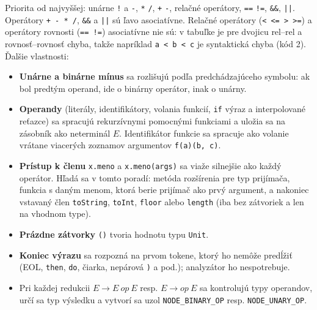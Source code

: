 Priorita od najvyššej: unárne \texttt{!} a \texttt{-}, \texttt{*} \texttt{/}, \texttt{+} \texttt{-}, relačné operátory, \texttt{==} \texttt{!=}, \texttt{\&\&}, \texttt{||}. Operátory \texttt{+ - * /}, \texttt{\&\&} a \texttt{||} sú ľavo asociatívne. Relačné operátory (\texttt{< <= > >=}) a operátory rovnosti (\texttt{== !=}) asociatívne nie sú: v tabuľke je pre dvojicu rel--rel a rovnosť--rovnosť chyba, takže napríklad \texttt{a < b < c} je syntaktická chyba (kód 2). Ďalšie vlastnosti:
\begin{itemize}
    \item \textbf{Unárne a binárne mínus} sa rozlišujú podľa predchádzajúceho symbolu: ak bol predtým operand, ide o binárny operátor, inak o unárny.
    \item \textbf{Operandy} (literály, identifikátory, volania funkcií, \texttt{if} výraz a interpolované reťazce) sa spracujú rekurzívnymi pomocnými funkciami a uložia sa na zásobník ako neterminál $E$. Identifikátor funkcie sa spracuje ako volanie vrátane viacerých zoznamov argumentov \texttt{f(a)(b, c)}.
    \item \textbf{Prístup k členu} \texttt{x.meno} a \texttt{x.meno(args)} sa viaže silnejšie ako každý operátor. Hľadá sa v tomto poradí: metóda rozšírenia pre typ prijímača, funkcia s daným menom, ktorá berie prijímač ako prvý argument, a nakoniec vstavaný člen \texttt{toString}, \texttt{toInt}, \texttt{floor} alebo \texttt{length} (iba bez zátvoriek a len na vhodnom type).
    \item \textbf{Prázdne zátvorky} \texttt{()} tvoria hodnotu typu \texttt{Unit}.
    \item \textbf{Koniec výrazu} sa rozpozná na prvom tokene, ktorý ho nemôže predĺžiť (EOL, \texttt{then}, \texttt{do}, čiarka, nepárová \texttt{)} a pod.); analyzátor ho nespotrebuje.
    \item Pri každej redukcii $E \rightarrow E\ op\ E$ resp. $E \rightarrow op\ E$ sa kontrolujú typy operandov, určí sa typ výsledku a vytvorí sa uzol \texttt{NODE\_BINARY\_OP} resp. \texttt{NODE\_UNARY\_OP}.
\end{itemize}

